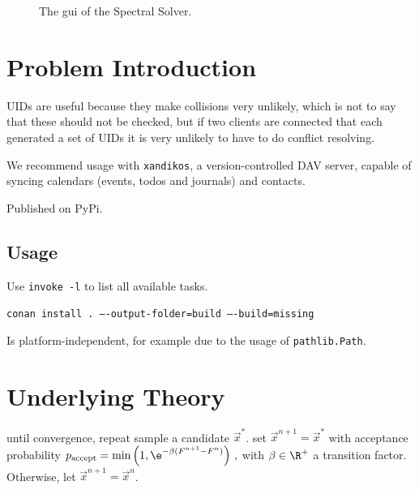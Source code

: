 \documentclass{prettytex/ox/mmsc-special-topic}
\title{\topictitle}
\author{Candidate \candidatenumber}
\date{\today}
\begin{document}
  \pagestyle{plain}
  \mmscSpecialHeader

  \begin{abstract}
    \label{abstract}
    In this project report we will review the central concepts utilised in the group work conducted to make progress in the \gls{pde} problem associated with the electrochemical model of a battery cell and present numerical results.
    \vspace*{0.2cm}

    \noindent
    \textbf{Our Goal:}
    Numerically obtain the solution $\{a(x, T), b(x, T)\}$.

    The Finite Difference schemes are implemented in Julia and Python, whereas the Spectral Method is implemented in C++.
  \end{abstract}

  \begin{figure}[H]
    \centering
    \caption{The \gls{gui} of the Spectral Solver.}
    \label{fig:gui}
  \end{figure}

  \pagebreak
  \pagestyle{normal}

  \section{Problem Introduction}
  \label{sec:introduction}

  UIDs are useful because they make collisions very unlikely, which is not to say that these should not be checked, but if two clients are connected that each generated a set of UIDs it is very unlikely to have to do conflict resolving.

  We recommend usage with \texttt{xandikos}, a version-controlled DAV server, capable of syncing calendars (events, todos and journals) and contacts.

  Published on PyPi.

  \subsection{Usage}
  Use \texttt{invoke -l} to list all available tasks.

  \texttt{conan install . ----output-folder=build ----build=missing}

  Is platform-independent, for example due to the usage of \texttt{pathlib.Path}.

  \section{Underlying Theory}
  \begin{algorithm}[language=pseudo,caption={\centering The Metropolis-Hastings sub-routine \parencite{metropolis, hastings}},basicstyle=\footnotesize]
until convergence, repeat
  sample a candidate $\vec{x}^*$.
  set $\vec{x}^{n+1} = \vec{x}^*$ with acceptance probability
    $p_{\rm accept} = \min\left(1, \e^{-\beta (F^{n+1} - F^n)}\right)\,,$ with $\beta \in \R^+$ a transition factor.
  Otherwise, let $\vec{x}^{n+1} = \vec{x}^{n}$.
  \end{algorithm}
\end{document}
